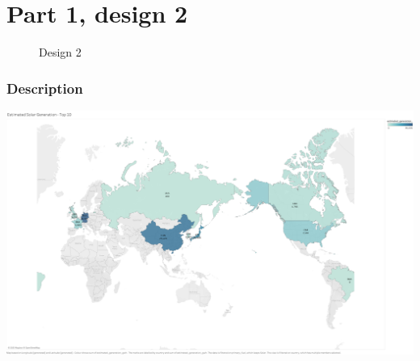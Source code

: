 \hypertarget{part-1-design-2}{%
\section{Part 1, design 2}\label{part-1-design-2}}

\begin{figure}

\caption{Design 2}
\end{figure}

\hypertarget{description}{%
\subsubsection{Description}\label{description}}

\centering
\includegraphics[width=15cm]{Viz2.png}

